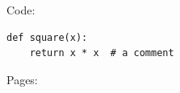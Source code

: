 \documentclass{article}
\begin{document}
Code:
\begin{verbatim}
def square(x):
    return x * x  # a comment
\end{verbatim}
Pages:

\end{document}
